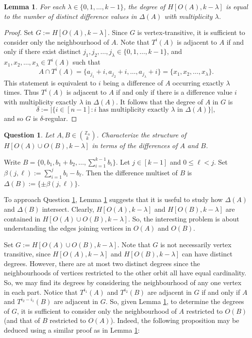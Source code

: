 \documentclass[12pt]{article}
\newcommand{\Z}{\mathbb{Z}}
\newtheorem{lem}{Lemma} %
\newtheorem{question}{Question}
\theoremstyle{definition}
\begin{document}
	\begin{lem}\label{Lemma-DegreeMultiplicities}
		For each $\lambda \in \{0,1, \ldots, k-1\}$, the degree of $H[O(A),k-\lambda]$ is equal to the number of distinct difference values in $\Delta(A)$ with multiplicity $\lambda$.
	\end{lem}
	\begin{proof}
		Set $G := H[O(A),k-\lambda]$.  Since $G$ is vertex-transitive, it is sufficient to consider only the neighbourhood of $A$.  Note that $T^i(A)$ is adjacent to $A$ if and only if there exist distinct $j_1, j_2, \ldots, j_\lambda \in \{0, 1, \ldots, k-1\}$, and $x_1, x_2, \ldots, x_\lambda \in T^i(A)$ such that 
		$$A \cap T^i(A) = \{a_{j_1} + i, a_{j_2} +i, \ldots, a_{j_{\lambda}} + i\} = \{x_1, x_2, \ldots, x_\lambda\}.$$
		This statement is equivalent to $i$ being a difference of $A$ occurring exactly $\lambda$ times.  Thus $T^i(A)$ is adjacent to $A$ if and only if there is a difference value $i$ with multiplicity exactly $\lambda$ in $\Delta(A)$.  It follows that the degree of $A$ in $G$ is 
		$$\delta := |\{i \in [n-1]: \text{$i$ has multiplicity exactly $\lambda$ in $\Delta(A)$}\}|,$$
		and so $G$ is $\delta$-regular. \qedhere
	\end{proof}

	\begin{question}\label{Question-OrbitUnionsCharacterization}
		Let $A, B \in {\Z_n \choose k}$.  Characterize the structure of $H[O(A) \cup O(B), k-\lambda]$ in terms of the differences of $A$ and $B$.
	\end{question}

	Write $B = \{0, b_1, b_1+b_2, \ldots, \sum_{i=1}^{k-1}b_i\}$.  Let $j \in [k-1]$ and $0 \leq \ell < j$.  Set $\beta(j,\ell) := \sum_{i=1}^{j}b_i - b_\ell$.  Then the difference multiset of $B$ is $\Delta(B) := \{\pm \beta(j,\ell)\}$.  
	
	To approach Question \ref{Question-OrbitUnionsCharacterization}, Lemma \ref{Lemma-DegreeMultiplicities} suggests that it is useful to study how $\Delta(A)$ and $\Delta(B)$ intersect.  Clearly, $H[O(A),k-\lambda]$ and $H[O(B),k-\lambda]$ are contained in $H[O(A) \cup O(B), k-\lambda]$. So, the interesting problem is about understanding the edges joining vertices in $O(A)$ and $O(B)$.
	
	Set $G := H[O(A) \cup O(B), k-\lambda]$.  Note that $G$ is not necessarily vertex transitive, since $H[O(A), k-\lambda]$ and $H[O(B),k-\lambda]$ can have distinct degrees.  However, there are at most two distinct degrees since the neighbourhoods of vertices restricted to the other orbit all have equal cardinality.  So, we may find its degrees by considering the neighbourhood of any one vertex in each part.  Notice that $T^{i_1}(A)$ and $T^{i_2}(B)$ are adjacent in $G$ if and only if $A$ and $T^{i_2-i_1}(B)$ are adjacent in $G$.  So, given Lemma \ref{Lemma-DegreeMultiplicities}, to determine the degrees of $G$, it is sufficient to consider only the neighbourhood of $A$ restricted to $O(B)$ (and that of $B$ restricted to $O(A)$).  Indeed, the following proposition may be deduced using a similar proof as in Lemma \ref{Lemma-DegreeMultiplicities}:
	
\end{document}
